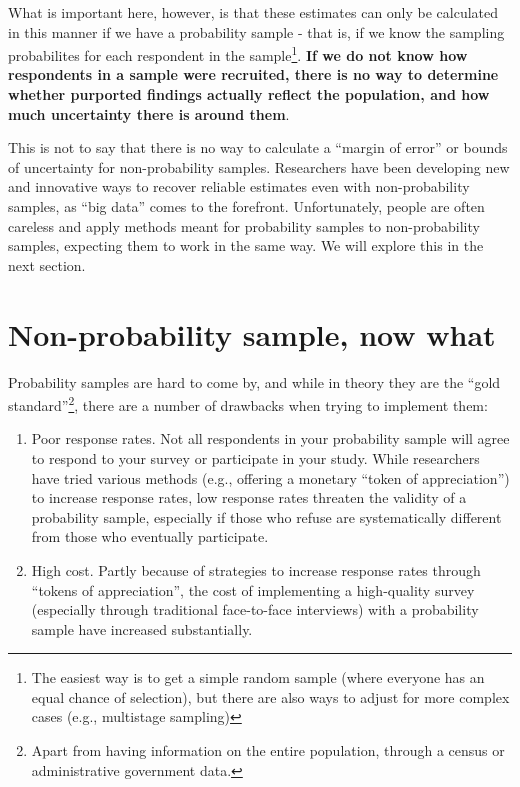 \documentclass[openany]{book}
\providecommand{\tightlist}{%
  \setlength{\itemsep}{0pt}\setlength{\parskip}{0pt}}
\let\rmarkdownfootnote\footnote%
\def\footnote{\protect\rmarkdownfootnote}
\begin{document}
What is important here, however, is that these estimates can only be
calculated in this manner if we have a probability sample - that is, if
we know the sampling probabilites for each respondent in the
sample\footnote{The easiest way is to get a simple random sample (where
  everyone has an equal chance of selection), but there are also ways to
  adjust for more complex cases (e.g., multistage sampling)}. \textbf{If
we do not know how respondents in a sample were recruited, there is no
way to determine whether purported findings actually reflect the
population, and how much uncertainty there is around them}.

This is not to say that there is no way to calculate a ``margin of
error'' or bounds of uncertainty for non-probability samples.
Researchers have been developing new and innovative ways to recover
reliable estimates even with non-probability samples, as ``big data''
comes to the forefront. Unfortunately, people are often careless and
apply methods meant for probability samples to non-probability samples,
expecting them to work in the same way. We will explore this in the next
section.

\section{Non-probability sample, now
what}\label{non-probability-sample-now-what}

Probability samples are hard to come by, and while in theory they are
the ``gold standard''\footnote{Apart from having information on the
  entire population, through a census or administrative government data.},
there are a number of drawbacks when trying to implement them:

\begin{enumerate}
\def\labelenumi{\arabic{enumi}.}
\tightlist
\item
  Poor response rates. Not all respondents in your probability sample
  will agree to respond to your survey or participate in your study.
  While researchers have tried various methods (e.g., offering a
  monetary ``token of appreciation'') to increase response rates, low
  response rates threaten the validity of a probability sample,
  especially if those who refuse are systematically different from those
  who eventually participate.
\item
  High cost. Partly because of strategies to increase response rates
  through ``tokens of appreciation'', the cost of implementing a
  high-quality survey (especially through traditional face-to-face
  interviews) with a probability sample have increased substantially.
\end{enumerate}
\end{document}
